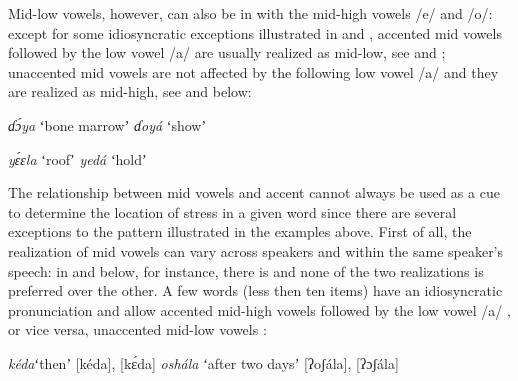 \documentclass[output=paper]{LSP/langsci}
\begin{document}
Mid-low vowels, however, can also be in  with the mid-high vowels /e/ and /o/: except for some idiosyncratic exceptions illustrated in  and , accented mid vowels followed by the low vowel /a/ are usually realized as mid-low, see  and ; unaccented mid vowels are not affected by the following low vowel /a/ and they are realized as mid-high, see  and  below:
\begin{exe}
	\ex \begin{xlist}
	\ex \textit{ɗɔ́ya}\hspace{10mm} ʻbone marrowʼ \label{ex:Petrollino:bone marrow}
    \ex \textit{ɗoyá}\hspace{10mm} ʻshowʼ \label{ex:Petrollino:show}
    \end{xlist}
\end{exe}

\begin{exe}
\ex \begin{xlist}
    \ex \textit{yɛ́ɛla}\hspace{10mm} ʻroofʼ \label{ex:Petrollino:roof}
    \ex \textit{yedá}\hspace{11mm} ʻholdʼ \label{ex:Petrollino:hold}
\end{xlist}
\end{exe}
The relationship between mid vowels and accent cannot always be used as a cue to determine the location of stress in a given word since there are several exceptions to the pattern illustrated in the examples above. First of all, the realization of mid vowels can vary across speakers and within the same speaker's speech: in  and  below, for instance, there is  and none of the two realizations is preferred over the other. 
A few words (less then ten items) have an idiosyncratic pronunciation and allow accented mid-high vowels followed by the low vowel /a/ , or vice versa, unaccented mid-low vowels :
\begin{exe}
	\ex \begin{xlist}
	\ex \textit{kéda}\hspace{8mm}ʻthenʼ\hspace{19mm} [kéda], [kɛ́da] \label{ex:Petrollino:keda}
    \ex \textit{oshála}\hspace{5mm} ʻafter two daysʼ\hspace{3mm} [ʔoʃála], [ʔɔʃála] \label{ex:Petrollino:oshala}
    \end{xlist}
\end{exe}
\end{document}
